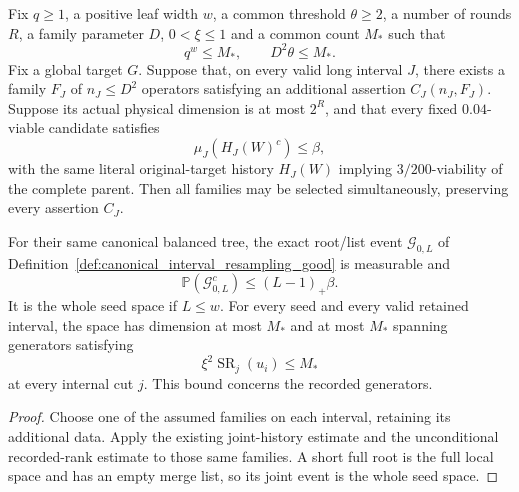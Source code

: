 \begin{lemma}
    \label{lem:canonical_interval_resampling_selection}
    \leanok
    Fix $q\ge1$, a positive leaf width $w$, a common threshold $\theta\ge2$,
    a number of rounds $R$, a family parameter $D$, $0<\xi\le1$ and a
    common count $M_*$ such that
    \[
        q^w\le M_*,\qquad D^2\theta\le M_*.
    \]
    Fix a global target $G$. Suppose that, on every valid long interval
    $J$, there exists a family $F_J$ of $n_J\le D^2$ operators satisfying
    an additional assertion $C_J(n_J,F_J)$. Suppose its actual physical
    dimension is at most $2^R$, and that every fixed $0.04$-viable
    candidate satisfies
    \[
        \mu_J(H_J(W)^c)\le\beta,
    \]
    with the same literal original-target history $H_J(W)$ implying
    $3/200$-viability of the complete parent. Then all families may be
    selected simultaneously, preserving every assertion $C_J$.

    For their same canonical balanced tree, the exact root/list event
    $\mathcal G_{0,L}$ of Definition~\ref{def:canonical_interval_resampling_good}
    is measurable and
    \[
        \mathbb P(\mathcal G_{0,L}^c)\le(L-1)_+\beta.
    \]
    It is the whole seed space if $L\le w$. For every seed and every
    valid retained interval, the space has dimension at most $M_*$
    and at most $M_*$ spanning generators satisfying
    \[
        \xi^2\operatorname{SR}_j(u_i)\le M_*
    \]
    at every internal cut $j$. This bound concerns the recorded generators.
\end{lemma}
\begin{proof}\leanok
    Choose one of the assumed families on each interval, retaining its
    additional data. Apply the existing joint-history estimate and the
    unconditional recorded-rank estimate to those same families.
    A short full root is the full local space and has an empty merge
    list, so its joint event is the whole seed space.
\end{proof}

